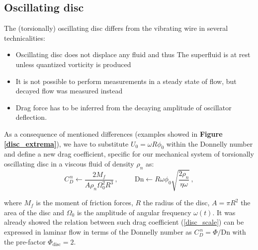 
\subsection{Oscillating disc}

The (torsionally) oscillating disc differs from the vibrating wire in several technicalities:

\begin{itemize}
  \item Oscillating disc does not displace any fluid and thus The superfluid is at rest unless quantized vorticity is produced
  \item It is not possible to perform measurements in a steady state of flow, but decayed flow was measured instead
  \item Drag force has to be inferred from the decaying amplitude of oscillator deflection.
\end{itemize}

As a consequence of mentioned differences (examples showed in \textbf{Figure \ref{disc_extrema}}), we have to substitute $U_0 = \omega R \phi_0$ within the Donnelly number and define a new drag coefficient, specific for our mechanical system of torsionally oscillating disc in a viscous fluid of density $\rho_n$ as:
\begin{equation}
C_D^{\,n} \leftarrow \frac{2M_f}{A\rho_n \Omega_0^2 R^3}\,,
\hspace{1cm}
\text{Dn} \leftarrow R\omega \phi_0 \sqrt{\frac{2\rho_n}{\eta\omega}}\,,
\label{disc_scale}
\end{equation}

where $M_f$ is the moment of friction forces, $R$ the radius of the disc, $A = \pi R^2$ the area of the disc and $\Omega_0$ is the amplitude of angular frequency $\omega(t)$. It was already showed \cite{universal_scaling} the relation between such drag coefficient (\ref{disc_scale}) can be expressed in laminar flow in terms of the Donnelly number as $C_D^{\,n} = \Phi /\text{Dn}$ with the pre-factor $\Phi_{\text{disc}} = 2$.

